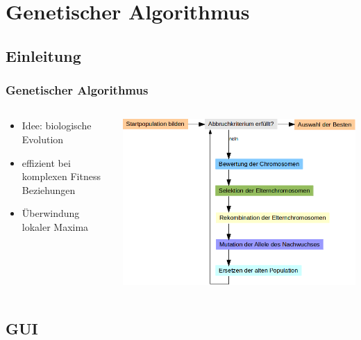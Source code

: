 \setlength{\floatsep}{4.0pt plus 1.0pt minus 1.0pt}
\section{Genetischer Algorithmus}

\subsection{Einleitung}

\begin{frame}
  \frametitle{Genetischer Algorithmus}
  \begin{columns}[T]
    \begin{column}{0.35\textwidth}
      \begin{itemize}
      \item Idee: biologische Evolution
      \item effizient bei komplexen Fitness Beziehungen
      \item Überwindung lokaler Maxima
      \end{itemize}
    \end{column}
    \begin{column}{0.65\textwidth}
        \includegraphics[width=\textwidth]{GenAlg-Diagramm.png}
    \end{column}
  \end{columns}
\end{frame}


\subsection{GUI}

